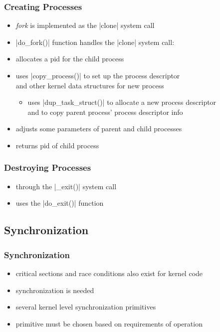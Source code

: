 \documentclass[dvipsnames]{beamer}
\begin{document}
\begin{frame}
  \frametitle{Creating Processes}

  \begin{itemize}
    \item \textit{fork} is implemented as the |clone| system call
    \item {}|do_fork()| function handles the |clone|
      system call:

    \medskip
    \item allocates a pid for the child process
    \item uses |copy_process()| to set up the process descriptor\\
      and other kernel data structures for new process
    \begin{itemize}
      \item uses |dup_task_struct()| to allocate a new process
        descriptor\\
        and to copy parent process' process descriptor info
    \end{itemize}
    \item adjusts some parameters of parent and child processes
    \item returns pid of child process
  \end{itemize}
\end{frame}

\begin{frame}
  \frametitle{Destroying Processes}

  \begin{itemize}
    \item through the |_exit()| system call
    \item uses the |do_exit()| function
  \end{itemize}
\end{frame}

\subsection{Synchronization}

\begin{frame}
  \frametitle{Synchronization}

  \begin{itemize}
    \item critical sections and race conditions also exist for kernel code
    \item synchronization is needed

    \bigskip
    \item several kernel level synchronization primitives
    \item primitive must be chosen based on requirements of operation
  \end{itemize}
\end{frame}
\end{document}
